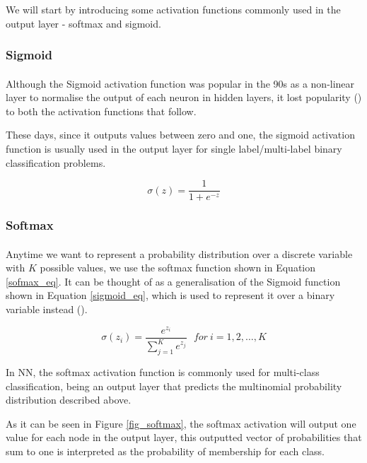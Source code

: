 We will start by introducing some activation functions commonly used in the output layer - softmax and sigmoid.

\subsubsection{Sigmoid}
\paragraph{}
Although the Sigmoid activation function was popular in the 90s as a non-linear layer to normalise the output of each neuron in hidden layers, it lost popularity (\cite{GoodBengCour16}) to both the activation functions that follow.

These days, since it outputs values between zero and one, the sigmoid activation function is usually used in the output layer for single label/multi-label binary classification problems. 

\begin{equation}
    \label{sigmoid_eq}
    \sigma(z) = \frac{1} {1 + e^{-z}}
\end{equation}

\subsubsection{Softmax}
\paragraph{}
Anytime we want to represent a probability distribution over a discrete variable with $K$ possible values, we use the softmax function shown in Equation \ref{sofmax_eq}. It can be thought of as a generalisation of the Sigmoid function shown in Equation \ref{sigmoid_eq}, which is used to represent it over a binary variable instead (\cite{GoodBengCour16}).

\begin{equation}
    \label{sofmax_eq}
    \sigma(z_i) = \frac{e^{z_{i}}}{\sum_{j=1}^K e^{z_{j}}} \ \ \ for\ i=1,2,\dots,K
\end{equation}

In \gls{NN}, the softmax activation function is commonly used for multi-class classification, being an output layer that predicts the multinomial probability distribution described above.

As it can be seen in Figure \ref{fig_softmax}, the softmax activation will output one value for each node in the output layer, this outputted vector of probabilities that sum to one is interpreted as the probability of membership for each class.

